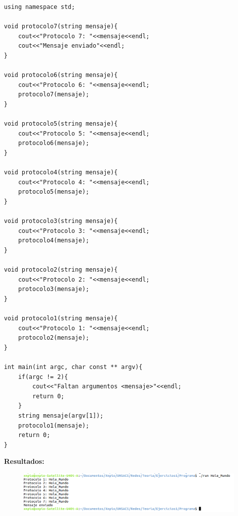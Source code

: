 \documentclass[a4paper,12pt]{article}
\begin{document}
\begin{enumerate}
\begin{lstlisting}
using namespace std;

void protocolo7(string mensaje){
	cout<<"Protocolo 7: "<<mensaje<<endl;
	cout<<"Mensaje enviado"<<endl;
}

void protocolo6(string mensaje){
	cout<<"Protocolo 6: "<<mensaje<<endl;
	protocolo7(mensaje);
}

void protocolo5(string mensaje){
	cout<<"Protocolo 5: "<<mensaje<<endl;
	protocolo6(mensaje);
}

void protocolo4(string mensaje){
	cout<<"Protocolo 4: "<<mensaje<<endl;
	protocolo5(mensaje);
}

void protocolo3(string mensaje){
	cout<<"Protocolo 3: "<<mensaje<<endl;
	protocolo4(mensaje);
}

void protocolo2(string mensaje){
	cout<<"Protocolo 2: "<<mensaje<<endl;
	protocolo3(mensaje);
}

void protocolo1(string mensaje){
	cout<<"Protocolo 1: "<<mensaje<<endl;
	protocolo2(mensaje);
}

int main(int argc, char const ** argv){
	if(argc != 2){
		cout<<"Faltan argumentos <mensaje>"<<endl;
		return 0;
	}
	string mensaje(argv[1]);
	protocolo1(mensaje);
	return 0;
}
\end{lstlisting}

\textbf{Resultados:} \\
\begin{figure}[H]
 \centering
 \includegraphics[scale = 0.5]{1.png}
\end{figure}




 
 
 
\end{enumerate}
\end{document}
